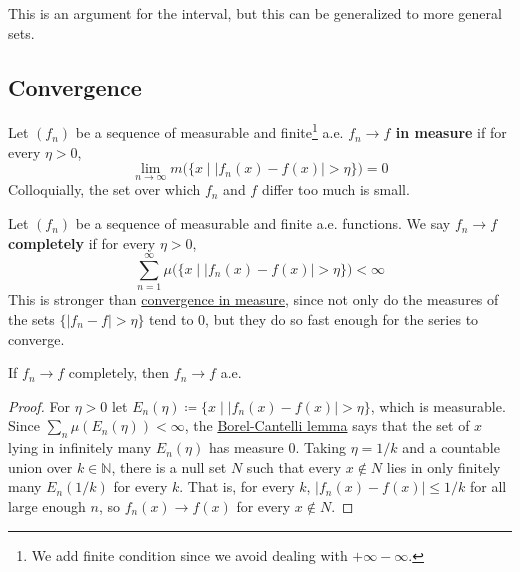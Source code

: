   This is an argument for the interval, but this can be generalized to more general sets. 

\subsection{Convergence} 

  \begin{definition}
    \label{def:convergence-in-measure}
    Let $(f_n)$ be a sequence of measurable and finite\footnote{We add finite condition since we avoid dealing with $+\infty - \infty$.} a.e. \textbf{$f_n \to f$ in measure} if for every $\eta > 0$, 
    \begin{equation}
      \lim_{n \to \infty} m \big( \{x \mid |f_n (x) - f(x)|  > \eta \}\big) = 0
    \end{equation}
    Colloquially, the set over which $f_n$ and $f$ differ too much is small. 
  \end{definition}

  \begin{definition}
    \label{def:complete-convergence}
    Let $(f_n)$ be a sequence of measurable and finite a.e. functions. We say $f_n \to f$ \textbf{completely} if for every $\eta > 0$, 
    \begin{equation}
      \sum_{n=1}^\infty \mu \big( \{x \mid |f_n (x) - f(x)| > \eta \} \big) < \infty
    \end{equation}
    This is stronger than \hyperref[def:convergence-in-measure]{convergence in measure}, since not only do the measures of the sets $\{|f_n - f| > \eta\}$ tend to $0$, but they do so fast enough for the series to converge. 
  \end{definition}

  \begin{theorem}
    \label{thm:complete-convergence-implies-almost-everywhere}
    If $f_n \to f$ completely, then $f_n \to f$ a.e. 
  \end{theorem}
  \begin{proof}
    For $\eta > 0$ let $E_n (\eta) \coloneqq \{x \mid |f_n (x) - f(x)| > \eta\}$, which is measurable. Since $\sum_n \mu(E_n (\eta)) < \infty$, the \hyperref[thm:borel-cantelli-lemma]{Borel-Cantelli lemma} says that the set of $x$ lying in infinitely many $E_n (\eta)$ has measure $0$. Taking $\eta = 1/k$ and a countable union over $k \in \mathbb{N}$, there is a null set $N$ such that every $x \not\in N$ lies in only finitely many $E_n (1/k)$ for every $k$. That is, for every $k$, $|f_n (x) - f(x)| \leq 1/k$ for all large enough $n$, so $f_n (x) \to f(x)$ for every $x \not\in N$. 
  \end{proof}

